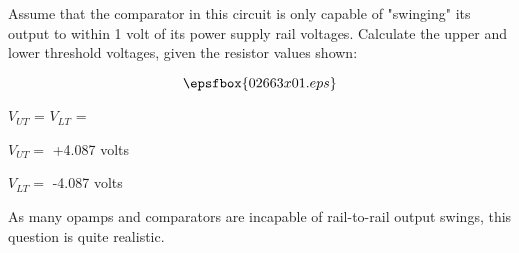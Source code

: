 

Assume that the comparator in this circuit is only capable of "swinging" its output to within 1 volt of its power supply rail voltages.  Calculate the upper and lower threshold voltages, given the resistor values shown:

$$\epsfbox{02663x01.eps}$$

$V_{UT}$ = \hskip 80pt $V_{LT}$ = 

\vskip 10pt







$V_{UT} =$ +4.087 volts

\vskip 10pt

$V_{LT} =$ -4.087 volts







As many opamps and comparators are incapable of rail-to-rail output swings, this question is quite realistic.





